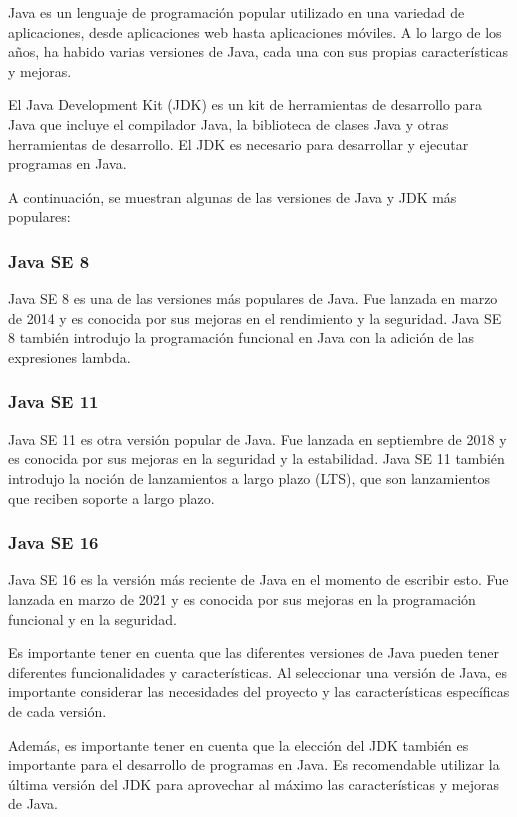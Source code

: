 \documentclass[executivepaper]{article}
\begin{document}
Java es un lenguaje de programación popular utilizado en una variedad de aplicaciones, desde aplicaciones web hasta aplicaciones móviles. A lo largo de los años, ha habido varias versiones de Java, cada una con sus propias características y mejoras.

El Java Development Kit (JDK) es un kit de herramientas de desarrollo para Java que incluye el compilador Java, la biblioteca de clases Java y otras herramientas de desarrollo. El JDK es necesario para desarrollar y ejecutar programas en Java.

A continuación, se muestran algunas de las versiones de Java y JDK más populares:

\subsubsection*{Java SE 8}

Java SE 8 es una de las versiones más populares de Java. Fue lanzada en marzo de 2014 y es conocida por sus mejoras en el rendimiento y la seguridad. Java SE 8 también introdujo la programación funcional en Java con la adición de las expresiones lambda.

\subsubsection*{Java SE 11}

Java SE 11 es otra versión popular de Java. Fue lanzada en septiembre de 2018 y es conocida por sus mejoras en la seguridad y la estabilidad. Java SE 11 también introdujo la noción de lanzamientos a largo plazo (LTS), que son lanzamientos que reciben soporte a largo plazo.

\subsubsection*{Java SE 16}

Java SE 16 es la versión más reciente de Java en el momento de escribir esto. Fue lanzada en marzo de 2021 y es conocida por sus mejoras en la programación funcional y en la seguridad.

Es importante tener en cuenta que las diferentes versiones de Java pueden tener diferentes funcionalidades y características. Al seleccionar una versión de Java, es importante considerar las necesidades del proyecto y las características específicas de cada versión.

Además, es importante tener en cuenta que la elección del JDK también es importante para el desarrollo de programas en Java. Es recomendable utilizar la última versión del JDK para aprovechar al máximo las características y mejoras de Java.
\end{document}
